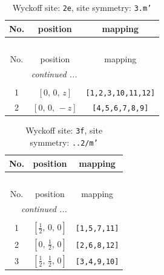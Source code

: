\documentclass[fleqn,8pt]{jsarticle}
\begin{document}
\begin{longtable}{ccc}
\caption{Wyckoff site: {\tt 2e}, site symmetry: {\tt 3.m'}}
 \\
 \hline \hline
No. & position & mapping \\ \hline \endfirsthead

\multicolumn{2}{l}{\tablename\ \thetable{}} \\
 \hline \hline
No. & position & mapping \\ \hline \endhead

 \hline \hline
\multicolumn{2}{r}{\footnotesize\it continued ...} \\ \endfoot

 \hline \hline
\multicolumn{2}{r}{} \\ \endlastfoot

1 & $\left[ 0,\, 0,\, z \right]$ & {\tt [1,2,3,10,11,12]} \\ \hline
2 & $\left[ 0,\, 0,\, - z \right]$ & {\tt [4,5,6,7,8,9]} \\
\end{longtable}
\renewcommand{\arraystretch}{1.2}
\begin{longtable}{ccc}
\caption{Wyckoff site: {\tt 3f}, site symmetry: {\tt ..2/m'}}
 \\
 \hline \hline
No. & position & mapping \\ \hline \endfirsthead

\multicolumn{2}{l}{\tablename\ \thetable{}} \\
 \hline \hline
No. & position & mapping \\ \hline \endhead

 \hline \hline
\multicolumn{2}{r}{\footnotesize\it continued ...} \\ \endfoot

 \hline \hline
\multicolumn{2}{r}{} \\ \endlastfoot

1 & $\left[ \frac{1}{2},\, 0,\, 0 \right]$ & {\tt [1,5,7,11]} \\ \hline
2 & $\left[ 0,\, \frac{1}{2},\, 0 \right]$ & {\tt [2,6,8,12]} \\ \hline
3 & $\left[ \frac{1}{2},\, \frac{1}{2},\, 0 \right]$ & {\tt [3,4,9,10]} \\
\end{longtable}
\renewcommand{\arraystretch}{1.2}
\end{document}
